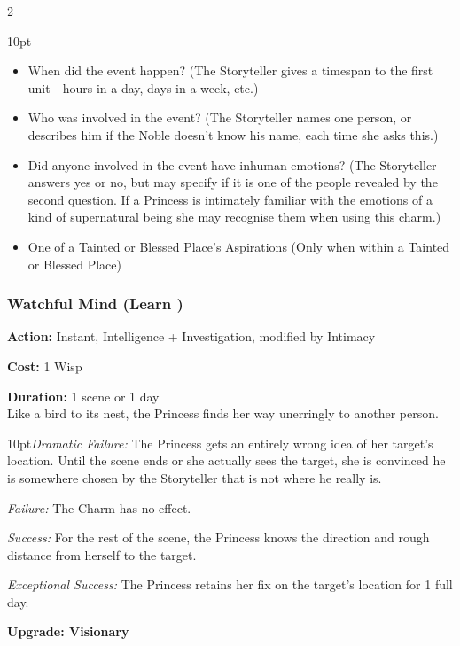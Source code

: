 \begin{multicols}{2}
\begin{myindentpar}{10pt}
\begin{itemize}
	\item When did the event happen? (The Storyteller gives a timespan to the first unit - hours in a day, days
in a week, etc.)
	\item Who was involved in the event? (The Storyteller names one person, or describes him if the Noble
doesn't know his name, each time she asks this.)
    \item Did anyone involved in the event have inhuman emotions? (The Storyteller answers yes or no, but may specify if it is one of the people revealed by the second question. If a Princess is intimately familiar with the emotions of a kind of supernatural being she may recognise them when using this charm.)
	\item One of a Tainted or Blessed Place's Aspirations (Only when within a Tainted or Blessed Place) 
	
	\end{itemize}
	
\end{myindentpar}

\subsubsection*{Watchful Mind (Learn \textbullet\textbullet)}

\noindent \textbf{Action:} Instant, Intelligence + Investigation, modified by Intimacy

\noindent \textbf{Cost:} 1 Wisp

\noindent \textbf{Duration:} 1 scene or 1 day \\

Like a bird to its nest, the Princess finds her way unerringly to another person.

\begin{myindentpar}{10pt}\emph{Dramatic Failure:} The Princess gets an entirely wrong idea of her target's location. Until the scene ends or she actually sees the target, she is convinced he is somewhere chosen by the Storyteller that is not where he really is.

    \emph{Failure:} The Charm has no effect.

    \emph{Success:} For the rest of the scene, the Princess knows the direction and rough distance from herself to the target.

    \emph{Exceptional Success:} The Princess retains her fix on the target's location for 1 full day.

\textbf{Upgrade: Visionary}


\end{myindentpar}
\end{multicols}
